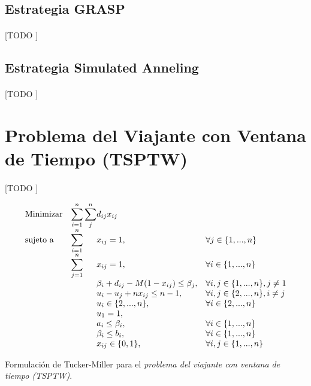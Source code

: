 \documentclass[spanish]{article}
\begin{document}
		\subsection{Estrategia GRASP}

			\paragraph{}
			[TODO ]

		\subsection{Estrategia Simulated Anneling}

			\paragraph{}
			[TODO ]

	\section{Problema del Viajante con Ventana de Tiempo (TSPTW)}

		\paragraph{}
		[TODO ]

		\begin{eqfloat}
			\begin{equation}
				\begin{array}{ll@{}ll}
					\text{Minimizar}	& \displaystyle\sum\limits_{i = 1}^{n}\sum\limits_{j}^{n} & d_{ij}x_{ij} &\\
					\text{sujeto a}		& \displaystyle\sum\limits_{i = 1}^{n}	&	x_{ij} 	= 1,  & \forall j \in \{1,...,n\} \\
														& \displaystyle\sum\limits_{j = 1}^{n}	&	x_{ij} 	= 1,  & \forall i \in \{1,...,n\} \\
														& 				&	\beta_{i} + d_{ij} - M(1-x_{ij}) \leq \beta_{j},  & \forall i, j \in \{1,...,n\}, j \neq 1 \\
														& 				&	u_i - u_j + n x_{ij}	\leq n-1,  & \forall i, j \in \{2,...,n\}, i \neq j \\
														&                               &	u_{i} \in \{2,...,n\}, 		& \forall i \in \{2,...,n\} \\
														&                               &	u_{1}  = 1, 	& \\
														&                               &	a_{i} \leq \beta_{i}, 		& \forall i \in \{1,...,n\} \\
														&                               &	\beta_{i} \leq b_{i}, 		& \forall i \in \{1,...,n\} \\
														&                               &	x_{ij} \in \{0,1\}, 	& \forall i,j \in \{1,...,n\}
				\end{array}
			\end{equation}
			\caption{Formulación de Tucker-Miller para el \emph{problema del viajante con ventana de tiempo (TSPTW)}.}
			\label{eq:tsp_tm}
		\end{eqfloat}
\end{document}
